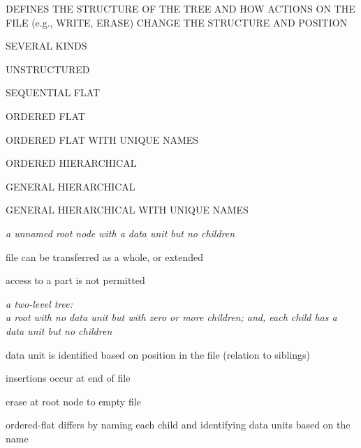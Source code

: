 \begin{bwslide}

\begin{nrtc}
\item	DEFINES THE STRUCTURE OF THE TREE AND HOW ACTIONS ON THE FILE
	(e.g., WRITE, ERASE) CHANGE THE STRUCTURE AND POSITION

\item	SEVERAL KINDS
    \begin{nrtc}
    \item	UNSTRUCTURED

    \item	SEQUENTIAL FLAT

    \item	ORDERED FLAT

    \item	ORDERED FLAT WITH UNIQUE NAMES

    \item	ORDERED HIERARCHICAL

    \item	GENERAL HIERARCHICAL

    \item	GENERAL HIERARCHICAL WITH UNIQUE NAMES
    \end{nrtc}
\end{nrtc}
\end{bwslide}




\begin{note}\em
a unnamed root node with a data unit but no children

file can be transferred as a whole, or extended

access to a part is not permitted
\end{note}




\begin{note}\em
a two-level tree:\\
a root with no data unit but with zero or more children;
and,
each child has a data unit but no children

data unit is identified based on position in the file (relation to siblings)

insertions occur at end of file

erase at root node to empty file

ordered-flat differs by naming each child and identifying data units based
on the name
\end{note}


